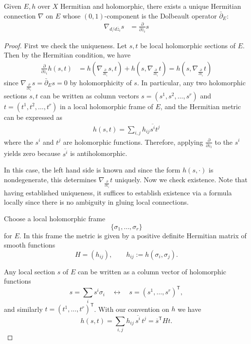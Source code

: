 \documentclass[12pt]{article}
\begin{document}
\begin{theorem}
    Given $E,h$ over $X$ Hermitian and holomorphic, there exists a unique Hermitian connection $\nabla$ on $E$ whose $(0,1)$-component is the Dolbeault operator $\bar{\partial}_E$:
\begin{align*}
    \nabla_{d/d\bar{z}_i} s & = \frac{\partial}{\partial \bar{z}_i} s
\end{align*}
\end{theorem}

\begin{proof}
    First we check the uniqueness. Let $s,t$ be local holomorphic sections of $E$. Then by the Hermitian condition, we have \begin{align*}
        \frac{\partial}{\partial z_i} h(s,t) & = h(\nabla_{\frac{\partial}{\partial \overline{z}_i}} s, t) + h(s, \nabla_{\frac{\partial}{\partial z_i}} t) = h(s, \nabla_{\frac{\partial}{\partial z_i}} t)
    \end{align*} since $\nabla_{\frac{\partial}{\partial \overline{z}_i}} s = \bar{\partial}_E s = 0$ by holomorphicity of $s$. In particular, any two holomorphic sections $s,t$ can be written as column vectors $s = (s^1, s^2, \ldots, s^r)$ and $t = (t^1, t^2, \ldots, t^r)$ in a local holomorphic frame of $E$, and the Hermitian metric can be expressed as \begin{align*}
h(s,t) = \sum_{i,j} h_{ij} \overline{s^i} t^j
\end{align*} where the $s^i$ and $t^j$ are holomorphic functions. Therefore, applying $\frac{\partial}{\partial z_i}$ to the $s^i$ yields zero because $\overline{s^i}$ is antiholomorphic.

    In this case, the left hand side is known and since the form $h(s, \cdot)$ is nondegenerate, this determines $\nabla_{\frac{\partial}{\partial z_i}} t$ uniquely. Now we check existence. Note that having established uniqueness, it suffices to establish existence via a formula locally since there is no ambiguity in gluing local connections.

Choose a local holomorphic frame
\[
  \{\sigma_1,\dots,\sigma_r\}
\]
for $E$.  In this frame the metric is given by a positive definite
Hermitian matrix of smooth functions
\[
  H=(h_{ij}), \qquad h_{ij} := h(\sigma_i,\sigma_j).
\]

Any local section $s$ of $E$ can be written as a column vector of
holomorphic functions
\[
  s = \sum_i s^i \sigma_i \quad\leftrightarrow\quad
  s = (s^1,\dots,s^r)^{\mathsf T},
\]
and similarly $t=(t^1,\dots,t^r)^{\mathsf T}$.  With our convention on
$h$ we have
\[
  h(s,t) = \sum_{i,j} h_{ij}\,\overline{s^i}\,t^j
         = \overline{s}^{\mathsf T} H t .
\]


\end{proof}
\end{document}

